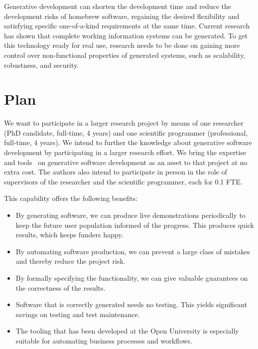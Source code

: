 \documentclass{elsarticle}
\begin{document}
   Generative development can shorten the development time and reduce the development risks of homebrew software,
   regaining the desired flexibility and satisfying specific one-of-a-kind requirements at the same time.
   Current research has shown that complete working information systems can be generated.
   To get this technology ready for real use, research needs to be done on gaining more control over non-functional properties of generated systems,
   such as scalability, robustness, and security.

\section{Plan}
   We want to participate in a larger research project by means of one researcher (PhD candidate, full-time, 4 years) and one scientific programmer (professional, full-time, 4 years).
   We intend to further the knowledge about generative software development by participating in a larger research effort.
   We bring the expertise~\cite{JoostenRAMiCS2017,Steenvoorden2022} and tools~\cite{Joosten-JLAMP2018,10.1145/3354166.3354182} on generative software development
   as an asset to that project at no extra cost.
   The authors also intend to participate in person in the role of supervisors of the researcher and the scientific programmer, each for 0.1 FTE.

   This capability offers the following benefits:
\begin{itemize}
    \item By generating software, we can produce live demonstrations periodically to keep the future user population informed of the progress.
    This produces quick results, which keeps funders happy.
    \item By automating software production, we can prevent a large class of mistakes and thereby reduce the project risk.
    \item By formally specifying the functionality, we can give valuable guarantees on the correctness of the results.
    \item Software that is correctly generated needs no testing. This yields significant savings on testing and test maintenance.
    \item The tooling that has been developed at the Open University is especially suitable for automating business processes and workflows.
\end{itemize}
\end{document}
